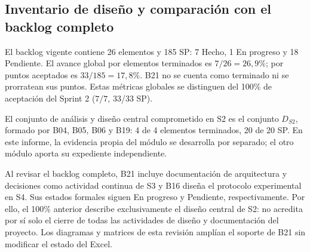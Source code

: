 \documentclass[12pt,a4paper]{article}
\begin{document}
\subsection{Inventario de diseño y comparación con el backlog completo}
El backlog vigente contiene 26 elementos y 185 SP: 7 Hecho, 1 En progreso y 18 Pendiente. El avance global por elementos terminados es $7/26=26{,}9\%$; por puntos aceptados es $33/185=17{,}8\%$. B21 no se cuenta como terminado ni se prorratean sus puntos. Estas métricas globales se distinguen del 100\% de aceptación del Sprint 2 ($7/7$, 33/33 SP).

El conjunto de análisis y diseño central comprometido en S2 es el conjunto $D_{S2}$, formado por B04, B05, B06 y B19: 4 de 4 elementos terminados, 20 de 20 SP. En este informe, la evidencia propia del módulo se desarrolla por separado; el otro módulo aporta su expediente independiente.

Al revisar el backlog completo, B21 incluye documentación de arquitectura y decisiones como actividad continua de S3 y B16 diseña el protocolo experimental en S4. Sus estados formales siguen En progreso y Pendiente, respectivamente. Por ello, el 100\% anterior describe exclusivamente el diseño central de S2: no acredita por sí solo el cierre de todas las actividades de diseño y documentación del proyecto. Los diagramas y matrices de esta revisión amplían el soporte de B21 sin modificar el estado del Excel.
\end{document}
